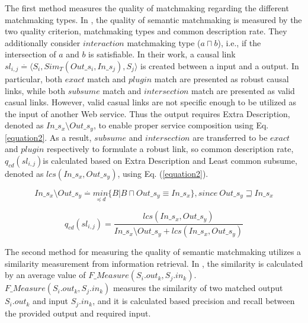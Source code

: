 The first method measures the quality of matchmaking regarding the different matchmaking types. In \cite{lecue2007making}, the quality of semantic matchmaking is measured by the two quality criterion, matchmaking types and common description rate. They additionally consider $interaction$ matchmaking type ($a \sqcap b$), i.e., if the intersection of $a$ and $b$ is satisfiable. In their work, a causal link \begin{math} sl_{i,j} \stackrel{.}{=} \langle S_i, Sim_{T}(Out\_s_i,In\_s_j),S_j  \rangle \end{math} is created between a input and a output. In particular, both $exact$ match and $plugin$ match are presented as robust causal links, while both $subsume$ match and $intersection$ match are presented as valid casual links. However, valid casual links are not specific enough to be utilized as the input of another Web service. Thus the output requires Extra Description, denoted as \begin{math} In\_s_x \setminus Out\_s_y \end{math}, to enable proper service composition using Eq. \ref{equation2}. As a result, $subsume$ and $intersection$ are transferred to be $exact$ and $plugin$ respectively to formulate a robust link, so common description rate, \begin{math} q_{cd}(sl_{i,j}) \end{math}is calculated based on Extra Description and Least common subsume, denoted as \begin{math} lcs (In\_s_x, Out\_s_y) \end{math}, using Eq. (\ref{equation2}).

\begin{equation}
In\_s_x \setminus Out\_s_y \stackrel{.}{=} \underset {\preceq d}{min} \{ B|B\sqcap  Out\_s_y \equiv In\_s_x  \} , since \  Out\_s_y \sqsupseteq In\_s_x
 \label{equation2}
\end{equation}


\begin{equation}
q_{cd}(sl_{i,j}) = \frac{lcs (In\_s_x, Out\_s_y)} {In\_s_x \setminus Out\_s_y + lcs (In\_s_x, Out\_s_y)}
 \label{equation3}
\end{equation}

The second method for measuring the quality of semantic matchmaking utilizes a similarity measurement from information retrieval. In \cite{pop2009immune}, the similarity is calculated by an average value of $F\_Measure(S_i.out_k, S_j.in_k)$. $F\_Measure(S_i.out_k, S_j.in_k)$ measures the similarity of two matched output $S_i.out_k$ and input $S_j.in_k$, and it is calculated based precision and recall between the provided output and required input.


